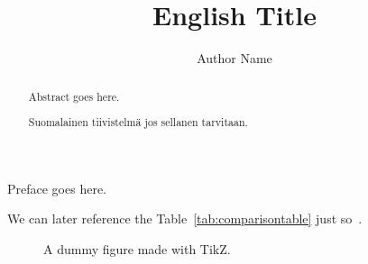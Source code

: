 \documentclass{tut-thesis}
\author 	{Author Name}
\title 		[Suomenkielinen otsikko]   {English Title}
\date 		{\Today} %
\begin{document}
\maketitle

\frontmatter
\begin{abstract}
	Abstract goes here.
\end{abstract}

\begin{otherlanguage}{finnish}
	\begin{abstract}
		Suomalainen tiivistelmä jos sellanen tarvitaan.
	\end{abstract}
\end{otherlanguage}

\begin{preface}
	Preface goes here.
\end{preface}

\tableofcontents
\listoftables
\listoffigures
\listofalgorithms

\printglossary

\mainmatter
\blinddocument %
\blindtext %

We can later reference the Table~\ref{tab:comparisontable} just so~\autocite{Doe2015}. \blindtext %

\begin{figure}
	\centering
	\caption{A dummy figure made with TikZ.}
	\label{fig:dummyfigure}
\end{figure}
\end{document}
